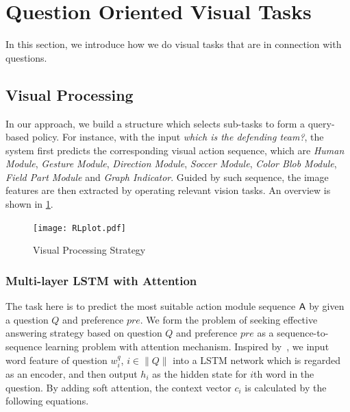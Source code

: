 \section{Question Oriented Visual Tasks}
\label{sec-reinforcement-learning}
In this section, we introduce how we do visual tasks that are in connection with questions. 




\subsection{Visual Processing}

In our approach, we build a structure which selects sub-tasks to form a query-based policy. For instance, with the input \textit{which is the defending team?}, the system first predicts the corresponding visual action sequence, which are \textit{Human Module}, \textit{Gesture Module}, \textit{Direction Module}, \textit{Soccer Module}, \textit{Color Blob Module}, \textit{Field Part Module} and \textit{Graph Indicator}. Guided by such sequence, the image features are then extracted by operating relevant vision tasks. An overview is shown in \cref{fig:RLplot}.  %

\label{sec-visual-processing}
\begin{figure}[h]
\begin{center}
\texttt{[image: RLplot.pdf]}
\end{center}
\caption{Visual Processing Strategy}
\label{fig:RLplot}
\end{figure}

\subsubsection{Multi-layer LSTM with Attention}
\label{sec-LSTM}
\hspace{\parindent}The task here is to predict the most suitable action module sequence ${\mathsf{A}}$ by given a question $Q$ and preference $pre$. We form the problem of seeking effective answering strategy based on question $Q$ and preference $pre$ as a sequence-to-sequence learning problem with attention mechanism. Inspired by~\cite{Bahdanau2016}, we input word feature of question $w_i^q$, $i\in\|Q\|$ into a LSTM network which is regarded as an encoder, and then output $h_i$ as the hidden state for $i$th word in the question. By adding soft attention, the context vector $c_i$ is calculated by the following equations.


